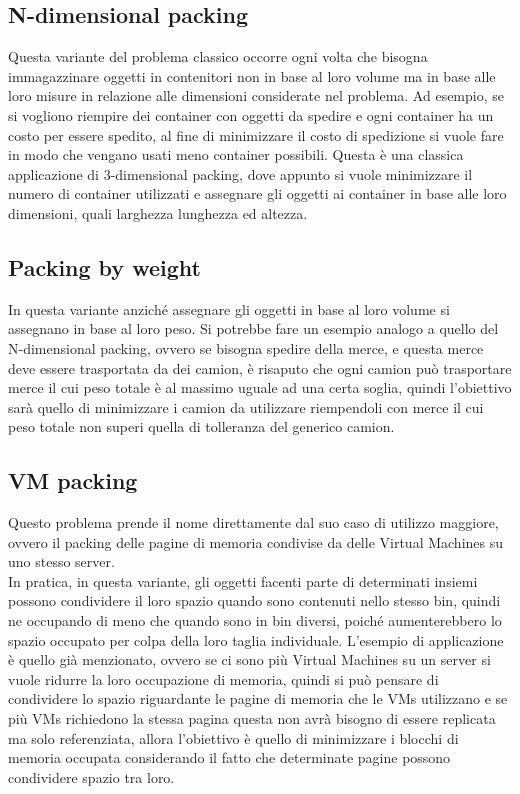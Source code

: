 \subsection{N-dimensional packing}
Questa variante del problema classico occorre ogni volta che bisogna immagazzinare oggetti in contenitori non in base al
loro volume ma in base alle loro misure in relazione alle dimensioni considerate nel problema. Ad esempio, se si vogliono
riempire dei container con oggetti da spedire e ogni container ha un costo per essere spedito, al fine di minimizzare il costo di spedizione si vuole fare in modo
che vengano usati meno container possibili. Questa è una classica applicazione di 3-dimensional packing, dove appunto si vuole
minimizzare il numero di container utilizzati e assegnare gli oggetti ai container in base alle loro dimensioni, quali larghezza
lunghezza ed altezza.

\subsection{Packing by weight}
In questa variante anziché assegnare gli oggetti in base al loro volume si assegnano in base al loro peso. Si potrebbe fare un
esempio analogo a quello del N-dimensional packing, ovvero se bisogna spedire della merce, e questa merce deve essere trasportata
da dei camion, è risaputo che ogni camion può trasportare merce il cui peso totale è al massimo uguale ad una certa soglia, quindi 
l'obiettivo sarà quello di minimizzare i camion da utilizzare riempendoli con merce il cui peso totale non superi quella di tolleranza
del generico camion.

\subsection{VM packing}
Questo problema prende il nome direttamente dal suo caso di utilizzo maggiore, ovvero il packing delle pagine di memoria
condivise da delle Virtual Machines su uno stesso server.\\
In pratica, in questa variante, gli oggetti facenti parte di determinati insiemi possono condividere il loro spazio quando sono contenuti nello 
stesso bin, quindi ne occupando di meno che quando sono in bin diversi, poiché aumenterebbero lo spazio occupato 
per colpa della loro taglia individuale. L'esempio di applicazione è quello già menzionato, ovvero se ci sono più Virtual Machines
su un server si vuole ridurre la loro occupazione di memoria, quindi si può pensare di condividere lo spazio riguardante le pagine di memoria
che le VMs utilizzano e se più VMs richiedono la stessa pagina questa non avrà bisogno di essere replicata ma solo referenziata,
allora l'obiettivo è quello di minimizzare i blocchi di memoria occupata considerando il fatto che determinate pagine possono
condividere spazio tra loro.

